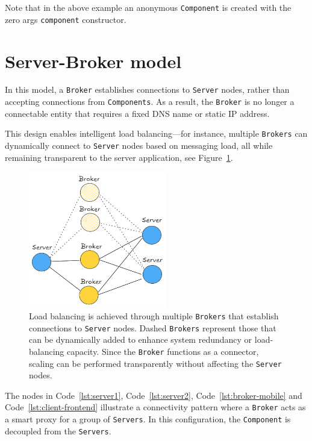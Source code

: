 \documentclass{juliacon}
\begin{document}
Note that in the above example an anonymous \texttt{Component} is
created with the zero args \texttt{component} constructor.

\section{Server-Broker model}\label{server-broker-model}

In this model, a \texttt{Broker} establishes connections to \texttt{Server} nodes, rather
than accepting connections from \texttt{Components}.
As a result, the \texttt{Broker} is no longer a connectable entity that requires a fixed DNS
name or static IP address.
\vskip 6pt

This design enables intelligent load balancing—for instance, multiple \texttt{Brokers} can
dynamically connect to \texttt{Server} nodes based on messaging load, all while remaining
transparent to the server application, see Figure~\ref{fig:server-broker}.

\begin{figure}[t]
  \centerline{\includegraphics[width=6cm]{figures/server-broker.png}}
  \caption{Load balancing is achieved through multiple \texttt{Brokers} that establish
           connections to \texttt{Server} nodes. Dashed \texttt{Brokers} represent those
           that can be dynamically added to enhance system redundancy or load-balancing
           capacity. Since the \texttt{Broker} functions as a connector, scaling can be
           performed transparently without affecting the \texttt{Server} nodes.}
  \label{fig:server-broker}
\end{figure}

The nodes in Code~\ref{lst:server1}, Code~\ref{lst:server2}, Code~\ref{lst:broker-mobile} and
Code~\ref{lst:client-frontend} illustrate a connectivity pattern where a \texttt{Broker} acts
as a smart proxy for a group of \texttt{Servers}. In this configuration, the \texttt{Component}
is decoupled from the \texttt{Servers}.
\vskip 6pt
\end{document}

